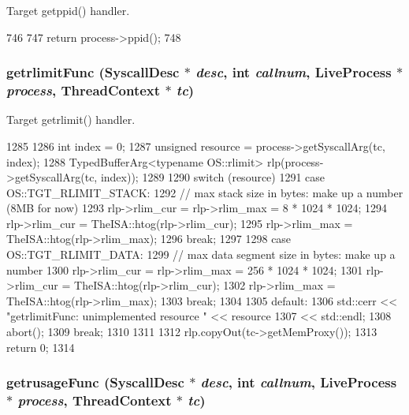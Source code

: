Target getppid() handler. 


\begin{DoxyCode}
746 {
747     return process->ppid();
748 }
\end{DoxyCode}
\hypertarget{syscall__emul_8hh_abda22e6d45080ba7498136f15e046d61}{
\subsubsection[{getrlimitFunc}]{ getrlimitFunc ({\bf SyscallDesc} $\ast$ {\em desc}, \/  int {\em callnum}, \/  {\bf LiveProcess} $\ast$ {\em process}, \/  {\bf ThreadContext} $\ast$ {\em tc})}}
\label{syscall__emul_8hh_abda22e6d45080ba7498136f15e046d61}


Target getrlimit() handler. 


\begin{DoxyCode}
1285 {
1286     int index = 0;
1287     unsigned resource = process->getSyscallArg(tc, index);
1288     TypedBufferArg<typename OS::rlimit> rlp(process->getSyscallArg(tc, index));
1289 
1290     switch (resource) {
1291         case OS::TGT_RLIMIT_STACK:
1292             // max stack size in bytes: make up a number (8MB for now)
1293             rlp->rlim_cur = rlp->rlim_max = 8 * 1024 * 1024;
1294             rlp->rlim_cur = TheISA::htog(rlp->rlim_cur);
1295             rlp->rlim_max = TheISA::htog(rlp->rlim_max);
1296             break;
1297 
1298         case OS::TGT_RLIMIT_DATA:
1299             // max data segment size in bytes: make up a number
1300             rlp->rlim_cur = rlp->rlim_max = 256 * 1024 * 1024;
1301             rlp->rlim_cur = TheISA::htog(rlp->rlim_cur);
1302             rlp->rlim_max = TheISA::htog(rlp->rlim_max);
1303             break;
1304 
1305         default:
1306             std::cerr << "getrlimitFunc: unimplemented resource " << resource
1307                 << std::endl;
1308             abort();
1309             break;
1310     }
1311 
1312     rlp.copyOut(tc->getMemProxy());
1313     return 0;
1314 }
\end{DoxyCode}
\hypertarget{syscall__emul_8hh_aa7d05f11e84b91416b82898ca0233e20}{
\subsubsection[{getrusageFunc}]{ getrusageFunc ({\bf SyscallDesc} $\ast$ {\em desc}, \/  int {\em callnum}, \/  {\bf LiveProcess} $\ast$ {\em process}, \/  {\bf ThreadContext} $\ast$ {\em tc})}}
\label{syscall__emul_8hh_aa7d05f11e84b91416b82898ca0233e20}


